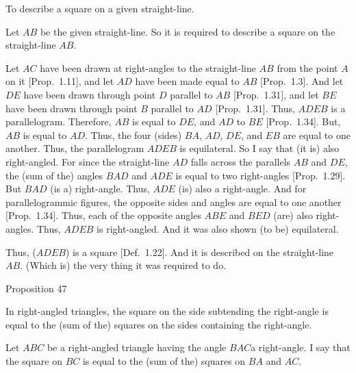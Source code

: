 To describe a square on a given straight-line.

Let $AB$ be the given straight-line. So it is required to describe a
square on the straight-line $AB$.

Let $AC$ have been drawn at right-angles to the straight-line $AB$
from the point $A$ on it [Prop.~1.11], and let $AD$ have been
made equal to $AB$ [Prop.~1.3]. And let $DE$ have been drawn
through point $D$ parallel to $AB$ [Prop.~1.31], and let $BE$ have been
drawn through point $B$ parallel to $AD$ [Prop.~1.31]. Thus,
$ADEB$ is a parallelogram. Therefore, $AB$ is equal to $DE$, and $AD$ to $BE$ [Prop.~1.34]. But, $AB$ is equal to $AD$. Thus, the four (sides) $BA$, $AD$, $DE$, and $EB$ are equal to one another. Thus, the parallelogram $ADEB$ is equilateral.
So I say that (it is) also right-angled. For since the straight-line $AD$ falls
across the parallels $AB$ and $DE$, the (sum of the) angles $BAD$ and $ADE$ is
equal to two right-angles [Prop.~1.29]. But $BAD$ (is a) right-angle. Thus,
$ADE$ (is) also a right-angle. And for parallelogrammic figures, the opposite
sides and angles are equal to one another [Prop.~1.34]. Thus, each of the
opposite angles $ABE$ and $BED$ (are) also right-angles. Thus, $ADEB$ is
right-angled. And it was also shown (to be) equilateral.

\epsfysize=2.5in
\centerline{}

Thus, ($ADEB$) is a square [Def.~1.22]. And it is described on the straight-line $AB$. (Which is) the very thing it was required to do.


\begin{center}
{\large Proposition 47}
\end{center}

In right-angled triangles,  the square on the side subtending the right-angle
is equal to the (sum of the) squares on the sides containing the right-angle.

Let $ABC$ be a right-angled triangle having the angle $BAC$a right-angle. I say that the
square on $BC$ is equal to the (sum of the) squares on $BA$ and $AC$.

